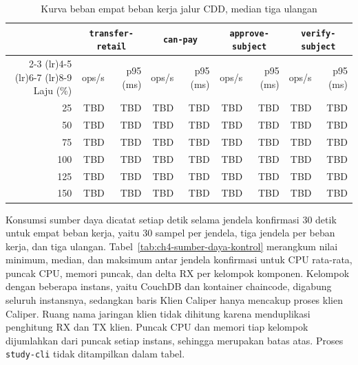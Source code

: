 \begin{table}[H]
\centering
\caption{Kurva beban empat beban kerja jalur CDD, median tiga ulangan}
\label{tab:ch4-kurva-beban}
\scriptsize
\begin{tabular}{rrrrrrrrr}
\toprule
 & \multicolumn{2}{c}{\texttt{transfer-retail}} & \multicolumn{2}{c}{\texttt{can-pay}} & \multicolumn{2}{c}{\texttt{approve-subject}} & \multicolumn{2}{c}{\texttt{verify-subject}} \\
\cmidrule(lr){2-3} \cmidrule(lr){4-5} \cmidrule(lr){6-7} \cmidrule(lr){8-9}
Laju (\%) & ops/s & p95 (ms) & ops/s & p95 (ms) & ops/s & p95 (ms) & ops/s & p95 (ms) \\
\midrule
25 & TBD & TBD & TBD & TBD & TBD & TBD & TBD & TBD \\
50 & TBD & TBD & TBD & TBD & TBD & TBD & TBD & TBD \\
75 & TBD & TBD & TBD & TBD & TBD & TBD & TBD & TBD \\
100 & TBD & TBD & TBD & TBD & TBD & TBD & TBD & TBD \\
125 & TBD & TBD & TBD & TBD & TBD & TBD & TBD & TBD \\
150 & TBD & TBD & TBD & TBD & TBD & TBD & TBD & TBD \\
\bottomrule
\end{tabular}%
\end{table}

Konsumsi sumber daya dicatat setiap detik selama jendela konfirmasi 30 detik untuk empat beban kerja, yaitu 30 sampel per jendela, tiga jendela per beban kerja, dan tiga ulangan. Tabel~\ref{tab:ch4-sumber-daya-kontrol} merangkum nilai minimum, median, dan maksimum antar jendela konfirmasi untuk CPU rata-rata, puncak CPU, memori puncak, dan delta RX per kelompok komponen. Kelompok dengan beberapa instans, yaitu CouchDB dan kontainer chaincode, digabung seluruh instansnya, sedangkan baris Klien Caliper hanya mencakup proses klien Caliper. Ruang nama jaringan klien tidak dihitung karena menduplikasi penghitung RX dan TX klien. Puncak CPU dan memori tiap kelompok dijumlahkan dari puncak setiap instans, sehingga merupakan batas atas. Proses \texttt{study-cli} tidak ditampilkan dalam tabel.

